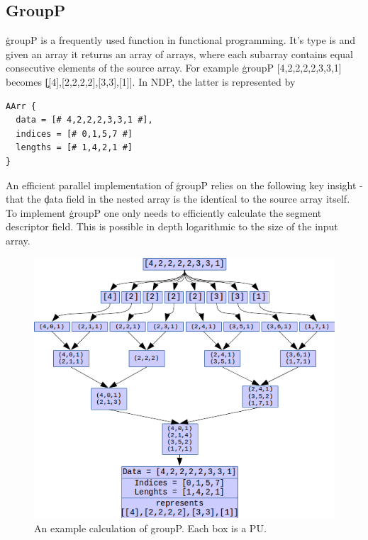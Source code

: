   \subsection{GroupP}
    \c{groupP} is a frequently used function in functional programming.
    It's type is \type{[:a:] -> [:[:a:]:]} and given an array it returns an array of arrays,
    where each subarray contains equal consecutive
    elements of the source array. For example
    \c{groupP [4,2,2,2,2,3,3,1]} becomes \c{[[4],[2,2,2,2],[3,3],[1]]}.
    In NDP, the latter is represented by
    \begin{lstlisting}
AArr {
  data = [# 4,2,2,2,3,3,1 #],
  indices = [# 0,1,5,7 #]
  lengths = [# 1,4,2,1 #]
}
    \end{lstlisting}
    An efficient parallel implementation of \c{groupP}
    relies on the following key insight - that the \c{data} field in the nested array
    is the identical to the source array itself. To implement \c{groupP} one only
    needs to efficiently calculate the segment descriptor field. This is
    possible in depth logarithmic to the size of the input array.
    
    \begin{figure}[h!]
        \begin{center}
        \includegraphics[width=\linewidth]{groupP.png}
        \caption{An example calculation of groupP. Each box is a PU.}
        \label{figure:groupP}
        \end{center}
    \end{figure}
    
